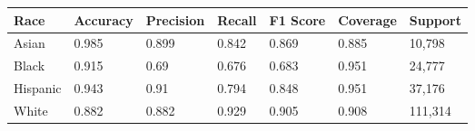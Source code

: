 \begin{tabular}{lllllll}
\toprule
Race & Accuracy & Precision & Recall & F1 Score & Coverage & Support \\
\midrule
Asian & 0.985 & 0.899 & 0.842 & 0.869 & 0.885 & 10,798 \\
Black & 0.915 & 0.69 & 0.676 & 0.683 & 0.951 & 24,777 \\
Hispanic & 0.943 & 0.91 & 0.794 & 0.848 & 0.951 & 37,176 \\
White & 0.882 & 0.882 & 0.929 & 0.905 & 0.908 & 111,314 \\
\bottomrule
\end{tabular}
